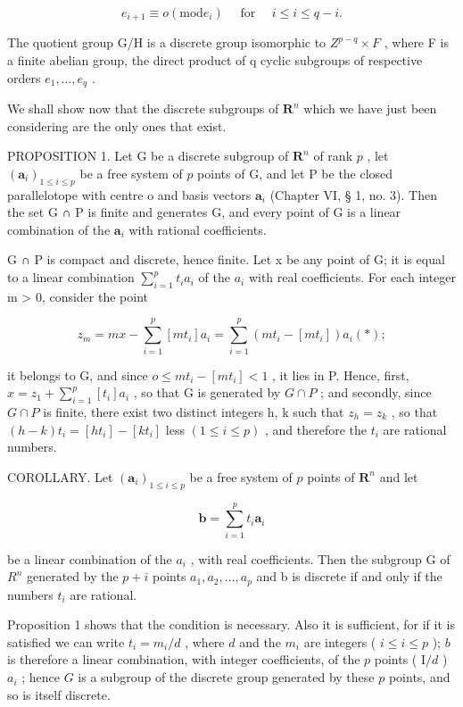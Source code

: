 \[
e _ {i + 1} \equiv o (\mathrm{mod} e _ {i}) \quad \text { for } \quad i \leqslant i \leqslant q - i.
\]

The quotient group G/H is a discrete group isomorphic to \(Z^{p-q} \times F\) , where F is a finite abelian group, the direct product of q cyclic subgroups of respective orders \(e_{1}, \ldots, e_{q}\) .

We shall show now that the discrete subgroups of \(\mathbf{R}^n\) which we have just been considering are the only ones that exist.

PROPOSITION 1. Let G be a discrete subgroup of \(\mathbf{R}^n\) of rank \(p\) , let \((\boldsymbol{a}_i)_{1 \leqslant i \leqslant p}\) be a free system of \(p\) points of G, and let P be the closed parallelotope with centre o and basis vectors \(\boldsymbol{a}_i\) (Chapter VI, § 1, no. 3). Then the set G ∩ P is finite and generates G, and every point of G is a linear combination of the \(\boldsymbol{a}_i\) with rational coefficients.

G ∩ P is compact and discrete, hence finite. Let x be any point of G; it is equal to a linear combination \(\sum_{i=1}^{p} t_{i}a_{i}\) of the \(a_{i}\) with real coefficients. For each integer m \textgreater{} 0, consider the point

\[
z _ {m} = m x - \sum_ {i = 1} ^ {p} [ m t _ {i} ] a _ {i} = \sum_ {i = 1} ^ {p} (m t _ {i} - [ m t _ {i} ]) a _ {i} (*);
\]

it belongs to G, and since \(o \leqslant mt_{i} - [mt_{i}] < 1\) , it lies in P. Hence, first, \(x = z_{1} + \sum_{i=1}^{p} [t_{i}] a_{i}\) , so that G is generated by \(G \cap P\) ; and secondly, since \(G \cap P\) is finite, there exist two distinct integers h, k such that \(z_{h} = z_{k}\) , so that \((h - k)t_{i} = [ht_{i}] - [kt_{i}]\) less \((1 \leqslant i \leqslant p)\) , and therefore the \(t_{i}\) are rational numbers.

COROLLARY. Let \((\pmb{a}_i)_{1\leqslant i\leqslant p}\) be a free system of \(p\) points of \(\mathbf{R}^n\) and let

\[
\boldsymbol {b} = \sum_ {i = 1} ^ {p} t _ {i} \boldsymbol {a} _ {i}
\]

be a linear combination of the \(a_{i}\) , with real coefficients. Then the subgroup G of \(R^{n}\) generated by the \(p + i\) points \(a_{1}, a_{2}, \ldots, a_{p}\) and b is discrete if and only if the numbers \(t_{i}\) are rational.

Proposition 1 shows that the condition is necessary. Also it is sufficient, for if it is satisfied we can write \(t_i = m_i / d\) , where \(d\) and the \(m_i\) are integers ( \(i \leqslant i \leqslant p\) ); \(b\) is therefore a linear combination, with integer coefficients, of the \(p\) points ( \(\mathrm{I} / d\) ) \(a_i\) ; hence \(G\) is a subgroup of the discrete group generated by these \(p\) points, and so is itself discrete.

